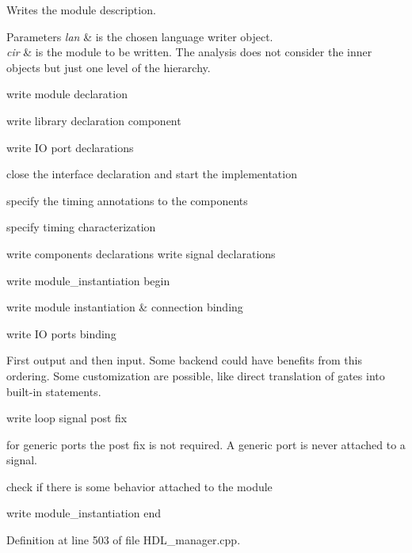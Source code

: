 Writes the module description. 


\begin{DoxyParams}{Parameters}
{\em lan} & is the chosen language writer object. \\
\hline
{\em cir} & is the module to be written. The analysis does not consider the inner objects but just one level of the hierarchy. \\
\hline
\end{DoxyParams}
write module declaration

write library declaration component

write IO port declarations

close the interface declaration and start the implementation

specify the timing annotations to the components

specify timing characterization

write components declarations write signal declarations

write module\+\_\+instantiation begin

write module instantiation \& connection binding

write IO ports binding

First output and then input. Some backend could have benefits from this ordering. Some customization are possible, like direct translation of gates into built-\/in statements.

write loop signal post fix

for generic ports the post fix is not required. A generic port is never attached to a signal.

check if there is some behavior attached to the module

write module\+\_\+instantiation end 

Definition at line 503 of file H\+D\+L\+\_\+manager.\+cpp.



